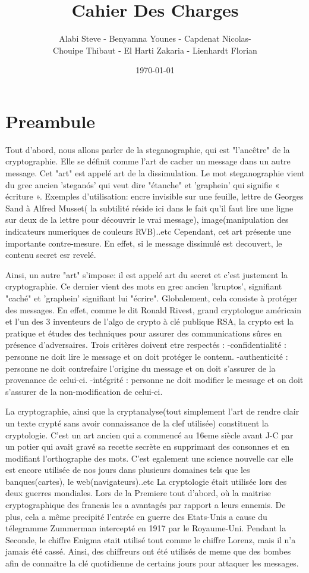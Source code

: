 \documentclass[a4]{article}
\author{Alabi Steve - Benyamna Younes - Capdenat Nicolas- \\
		Chouipe Thibaut - El Harti Zakaria - Lienhardt Florian}
\title{Cahier Des Charges}
\date{\today}
\begin{document}
\maketitle
		\section{Preambule}
				Tout d'abord, nous allons parler de la steganographie, qui est "l'ancêtre" de la cryptographie. Elle se définit comme l'art de cacher un message dans un autre message. Cet "art"
				est appelé art de la dissimulation. Le mot steganographie vient du grec 	ancien 'steganós' qui veut dire "étanche" et 'graphein' qui signifie « écriture ». 		
				Exemples d'utilisation: 
				encre invisible sur une feuille, lettre de Georges Sand à Alfred Musset( la subtilité réside ici dans le fait qu'il faut lire une ligne sur deux de la lettre pour découvrir le vrai message),
				image(manipulation des indicateurs numeriques de couleurs RVB)..etc
				Cependant, cet art présente une importante contre-mesure. En effet, si le message dissimulé est decouvert, le contenu secret esr revelé.

				Ainsi, un autre "art" s'impose: il est appelé art du secret et c'est justement la cryptographie. Ce dernier vient des mots en grec ancien 'kruptos', signifiant "caché" et 'graphein'
				signifiant lui "écrire". Globalement, cela consiste à protéger des messages. En effet, comme le dit Ronald Rivest, grand cryptologue américain et l'un des 3 inventeurs de l'algo
				de crypto à clé publique RSA, la crypto est la pratique et études des techniques pour assurer des communications sûres en présence d'adversaires.
				Trois critères doivent etre respectés : 
				-confidentialité : personne ne doit lire le message et on doit protéger le contenu.
				-authenticité : personne ne doit contrefaire l'origine du message et on doit s'assurer de la 							provenance de celui-ci.
				-intégrité : personne ne doit modifier le message et on doit s'assurer de la non-modification 							de celui-ci.

				La cryptographie, ainsi que la cryptanalyse(tout simplement l'art de rendre clair un texte crypté sans avoir connaissance de la clef utilisée) constituent la cryptologie.
				C'est un art ancien qui a commencé au 16eme siècle avant J-C par un potier qui avait gravé sa recette secrète en supprimant des consonnes et en modifiant l'orthographe des mots.
				C'est egalement une science nouvelle car elle est encore utilisée de nos jours dans plusieurs domaines tels que les banques(cartes), le web(navigateurs)..etc
				La cryptologie était utilisée lors des deux guerres mondiales. Lors de la Premiere tout d'abord, où la maitrise cryptographique des francais les a avantagés par rapport a leurs
				ennemis. De plus, cela a même precipité l'entrée en guerre des Etats-Unis a cause du télegramme Zummerman intercepté en 1917 par le Royaume-Uni.
				Pendant la Seconde, le chiffre Enigma etait utilisé tout comme le chiffre Lorenz, mais il n'a jamais été cassé. Ainsi, des chiffreurs ont été utilisés de meme que des bombes afin de 
				connaitre la clé quotidienne de certains jours pour attaquer les messages.
				
\end{document}
